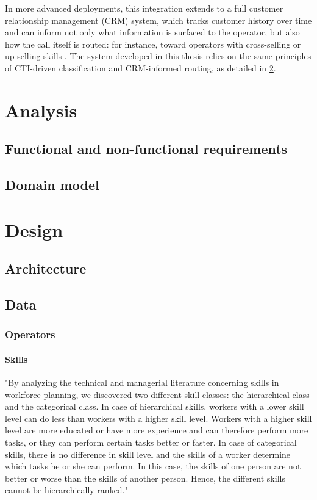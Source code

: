 \documentclass[12pt,a4paper,openright,twoside]{book}
\begin{document}
In more advanced deployments, this integration extends to a full customer relationship management (CRM) system,
which tracks customer history over time and can inform not only what information is surfaced to the operator,
but also how the call itself is routed: for instance, toward operators with cross-selling or up-selling skills \cite{gans2003telephone}.
The system developed in this thesis relies on the same principles of CTI-driven classification and
CRM-informed routing, as detailed in \cref{chap:design}.


\chapter{Analysis}
\label{chap:analysis}


\section{Functional and non-functional requirements}
\section{Domain model}

\chapter{Design}
\label{chap:design}
\section{Architecture}
\section{Data}
\subsection{Operators}
\subsubsection{Skills}
"By analyzing the technical and managerial literature concerning skills in workforce planning, we discovered two different skill classes: the hierarchical class and the categorical class.
In case of hierarchical skills, workers with a lower skill level can do less than workers with a higher skill level. Workers with a higher skill level are more educated or have more experience
and can therefore perform more tasks, or they can perform certain tasks better or faster.
In case of categorical skills, there is no difference in skill level and the skills of a worker determine which tasks he or she can perform. In this case, the skills of one person are not better or worse
than the skills of another person. Hence, the different skills cannot be hierarchically ranked."\cite{de2015workforce}
\end{document}
